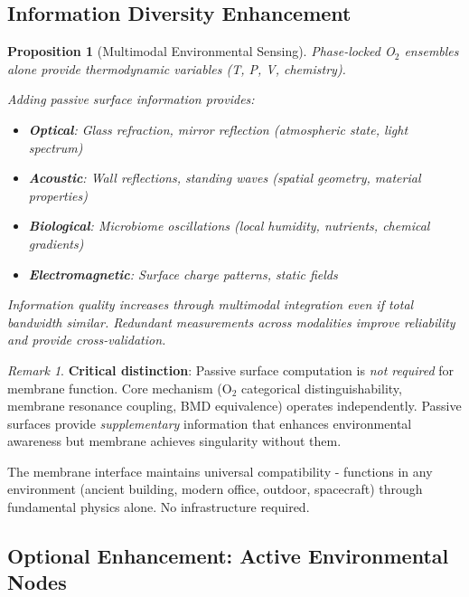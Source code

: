 \documentclass[11pt,a4paper]{article}
\newtheorem{proposition}[theorem]{Proposition}
\theoremstyle{definition}
\theoremstyle{remark}
\newtheorem{remark}[theorem]{Remark}
\begin{document}
\subsection{Information Diversity Enhancement}

\begin{proposition}[Multimodal Environmental Sensing]
Phase-locked O$_2$ ensembles alone provide thermodynamic variables (T, P, V, chemistry). 

Adding passive surface information provides:
\begin{itemize}
\item \textbf{Optical}: Glass refraction, mirror reflection (atmospheric state, light spectrum)
\item \textbf{Acoustic}: Wall reflections, standing waves (spatial geometry, material properties)
\item \textbf{Biological}: Microbiome oscillations (local humidity, nutrients, chemical gradients)
\item \textbf{Electromagnetic}: Surface charge patterns, static fields
\end{itemize}

Information quality increases through multimodal integration even if total bandwidth similar. Redundant measurements across modalities improve reliability and provide cross-validation.
\end{proposition}

\begin{remark}
\textbf{Critical distinction}: Passive surface computation is \textit{not required} for membrane function. Core mechanism (O$_2$ categorical distinguishability, membrane resonance coupling, BMD equivalence) operates independently. Passive surfaces provide \textit{supplementary} information that enhances environmental awareness but membrane achieves singularity without them.

The membrane interface maintains universal compatibility - functions in any environment (ancient building, modern office, outdoor, spacecraft) through fundamental physics alone. No infrastructure required.
\end{remark}

\subsection{Optional Enhancement: Active Environmental Nodes}
\end{document}
